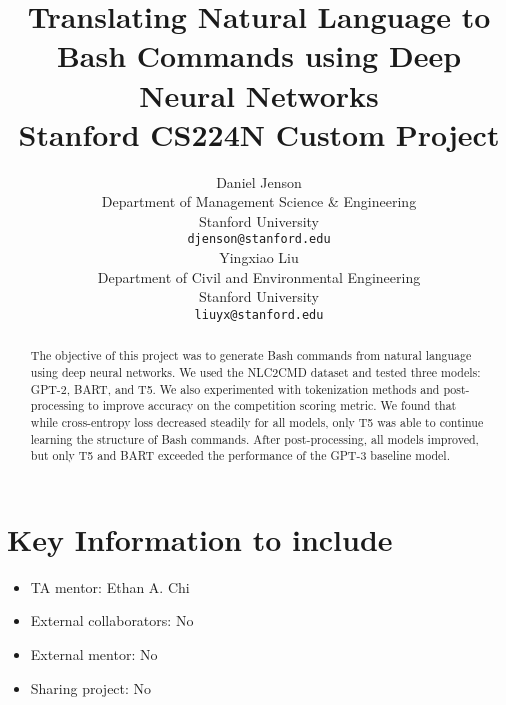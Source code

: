 \documentclass{article}
\title{
  Translating Natural Language to Bash Commands using Deep Neural Networks \\
  \vspace{1em}
  \small{\normalfont Stanford CS224N Custom Project}
}
\author{
 Daniel Jenson \\
  Department of Management Science \& Engineering \\
  Stanford University \\
  \texttt{djenson@stanford.edu} \\
  \And
  Yingxiao Liu \\
  Department of Civil and Environmental Engineering \\
  Stanford University \\
  \texttt{liuyx@stanford.edu} \\
}
\begin{document}
\maketitle

\begin{abstract}
  The objective of this project was to generate Bash commands from natural
  language using deep neural networks. We used the NLC2CMD dataset and tested
  three models: GPT-2, BART, and T5. We also experimented with tokenization methods
  and post-processing to improve accuracy on the competition scoring metric. We
  found that while cross-entropy loss decreased steadily for all models,
  only T5 was able to continue learning the structure of Bash commands. After
  post-processing, all models improved, but only T5 and BART exceeded
  the performance of the GPT-3 baseline model.
\end{abstract}


\section{Key Information to include}
\begin{itemize}
	\item TA mentor: Ethan A. Chi
	\item External collaborators: No
	\item External mentor: No
	\item Sharing project: No
\end{itemize}



\end{document}
